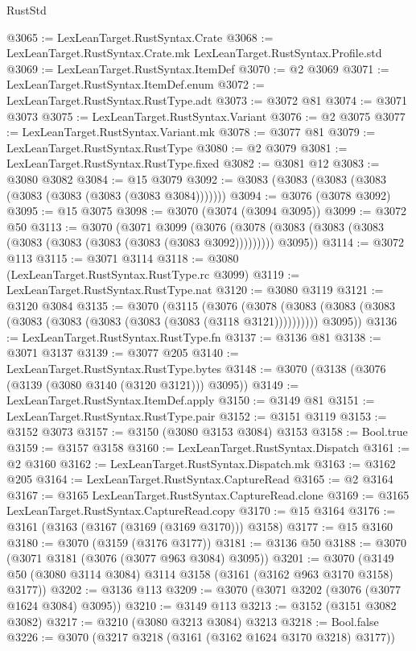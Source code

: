 \begin{lexlean}{RustStd}
\begin{coremodule}
@3065 := LexLeanTarget.RustSyntax.Crate
@3068 := LexLeanTarget.RustSyntax.Crate.mk LexLeanTarget.RustSyntax.Profile.std
@3069 := LexLeanTarget.RustSyntax.ItemDef
@3070 := @2 @3069
@3071 := LexLeanTarget.RustSyntax.ItemDef.enum
@3072 := LexLeanTarget.RustSyntax.RustType.adt
@3073 := @3072 @81
@3074 := @3071 @3073
@3075 := LexLeanTarget.RustSyntax.Variant
@3076 := @2 @3075
@3077 := LexLeanTarget.RustSyntax.Variant.mk
@3078 := @3077 @81
@3079 := LexLeanTarget.RustSyntax.RustType
@3080 := @2 @3079
@3081 := LexLeanTarget.RustSyntax.RustType.fixed
@3082 := @3081 @12
@3083 := @3080 @3082
@3084 := @15 @3079
@3092 := @3083 (@3083 (@3083 (@3083 (@3083 (@3083 (@3083 (@3083 @3084)))))))
@3094 := @3076 (@3078 @3092)
@3095 := @15 @3075
@3098 := @3070 (@3074 (@3094 @3095))
@3099 := @3072 @50
@3113 := @3070
    (@3071
      @3099
      (@3076 (@3078 (@3083 (@3083 (@3083 (@3083 (@3083 (@3083 (@3083 (@3083 @3092))))))))) @3095))
@3114 := @3072 @113
@3115 := @3071 @3114
@3118 := @3080 (LexLeanTarget.RustSyntax.RustType.rc @3099)
@3119 := LexLeanTarget.RustSyntax.RustType.nat
@3120 := @3080 @3119
@3121 := @3120 @3084
@3135 := @3070
    (@3115
      (@3076
        (@3078 (@3083 (@3083 (@3083 (@3083 (@3083 (@3083 (@3083 (@3083 (@3118 @3121))))))))))
        @3095))
@3136 := LexLeanTarget.RustSyntax.RustType.fn
@3137 := @3136 @81
@3138 := @3071 @3137
@3139 := @3077 @205
@3140 := LexLeanTarget.RustSyntax.RustType.bytes
@3148 := @3070 (@3138 (@3076 (@3139 (@3080 @3140 (@3120 @3121))) @3095))
@3149 := LexLeanTarget.RustSyntax.ItemDef.apply
@3150 := @3149 @81
@3151 := LexLeanTarget.RustSyntax.RustType.pair
@3152 := @3151 @3119
@3153 := @3152 @3073
@3157 := @3150 (@3080 @3153 @3084) @3153
@3158 := Bool.true
@3159 := @3157 @3158
@3160 := LexLeanTarget.RustSyntax.Dispatch
@3161 := @2 @3160
@3162 := LexLeanTarget.RustSyntax.Dispatch.mk
@3163 := @3162 @205
@3164 := LexLeanTarget.RustSyntax.CaptureRead
@3165 := @2 @3164
@3167 := @3165 LexLeanTarget.RustSyntax.CaptureRead.clone
@3169 := @3165 LexLeanTarget.RustSyntax.CaptureRead.copy
@3170 := @15 @3164
@3176 := @3161 (@3163 (@3167 (@3169 (@3169 @3170))) @3158)
@3177 := @15 @3160
@3180 := @3070 (@3159 (@3176 @3177))
@3181 := @3136 @50
@3188 := @3070 (@3071 @3181 (@3076 (@3077 @963 @3084) @3095))
@3201 := @3070 (@3149 @50 (@3080 @3114 @3084) @3114 @3158 (@3161 (@3162 @963 @3170 @3158) @3177))
@3202 := @3136 @113
@3209 := @3070 (@3071 @3202 (@3076 (@3077 @1624 @3084) @3095))
@3210 := @3149 @113
@3213 := @3152 (@3151 @3082 @3082)
@3217 := @3210 (@3080 @3213 @3084) @3213
@3218 := Bool.false
@3226 := @3070 (@3217 @3218 (@3161 (@3162 @1624 @3170 @3218) @3177))

\end{coremodule}
\end{lexlean}
